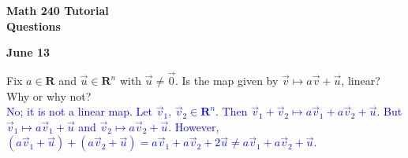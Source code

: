 \documentclass[a4paper,11pt]{article}
\newcommand{\R}{\mathbf{R}}
\newcommand{\BB}[1]{\textcolor{blue}{#1}}
\begin{document}
\begin{center}
  {\Large\bfseries Math 240 Tutorial \\ Questions}
\end{center}
\begin{center}
  {\bfseries June 13}
\end{center}

 Fix $a \in \R$ and $\vec u \in \R^n$ with $\vec
u \neq \vec 0$. Is the map given by $\vec v \mapsto a\vec v + \vec u$, linear?
Why or why not? \\

\BB{No; it is not a linear map. Let $\vec v_1,\,\vec v_2 \in \R^n$. Then $\vec
  v_1+\vec v_2 \mapsto a\vec v_1+a\vec v_2+\vec u$. But $\vec v_1 \mapsto a\vec
  v_1+\vec u$ and $\vec v_2 \mapsto a\vec v_2+\vec u$. However, $(a\vec v_1+\vec
  u)+(a\vec v_2+\vec u)=a\vec v_1+a\vec v_2+2\vec u \neq a\vec v_1+a\vec
  v_2+\vec u$. \\}
\end{document}
